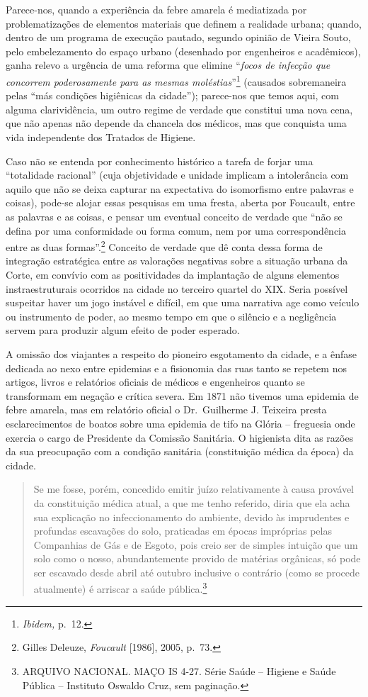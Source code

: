 Parece-nos, quando a experiência da febre amarela é mediatizada por
problematizações de elementos materiais que definem a realidade urbana;
quando, dentro de um programa de execução pautado, segundo opinião de
Vieira Souto, pelo embelezamento do espaço urbano (desenhado por
engenheiros e acadêmicos), ganha relevo a urgência de uma reforma que
elimine ``\emph{focos de infecção que concorrem poderosamente para as
mesmas moléstias}''\footnote{\emph{Ibidem,} p.~12.} (causados
sobremaneira pelas ``más condições higiênicas da cidade''); parece-nos
que temos aqui, com alguma clarividência, um outro regime de verdade que
constitui uma nova cena, que não apenas não depende da chancela dos
médicos, mas que conquista uma vida independente dos Tratados de
Higiene.

Caso não se entenda por conhecimento histórico a tarefa de forjar uma
``totalidade racional'' (cuja objetividade e unidade implicam a
intolerância com aquilo que não se deixa capturar na expectativa do
isomorfismo entre palavras e coisas), pode-se alojar essas pesquisas em
uma fresta, aberta por Foucault, entre as palavras e as coisas, e pensar
um eventual conceito de verdade que ``não se defina por uma conformidade
ou forma comum, nem por uma correspondência entre as duas
formas''.\footnote{Gilles Deleuze, \emph{Foucault} {[}1986{]}, 2005,
  p.~73.} Conceito de verdade que dê conta dessa forma de integração
estratégica entre as valorações negativas sobre a situação urbana da
Corte, em convívio com as positividades da implantação de alguns
elementos instraestruturais ocorridos na cidade no terceiro quartel do
XIX. Seria possível suspeitar haver um jogo instável e difícil, em que
uma narrativa age como veículo ou instrumento de poder, ao mesmo tempo
em que o silêncio e a negligência servem para produzir algum efeito de
poder esperado.

A omissão dos viajantes a respeito do pioneiro esgotamento da cidade, e
a ênfase dedicada ao nexo entre epidemias e a fisionomia das ruas tanto
se repetem nos artigos, livros e relatórios oficiais de médicos e
engenheiros quanto se transformam em negação e crítica severa. Em 1871
não tivemos uma epidemia de febre amarela, mas em relatório oficial o
Dr.~Guilherme J. Teixeira presta esclarecimentos de boatos sobre uma
epidemia de tifo na Glória -- freguesia onde exercia o cargo de
Presidente da Comissão Sanitária. O higienista dita as razões da sua
preocupação com a condição sanitária (constituição médica da época) da
cidade.

\begin{quote}
Se me fosse, porém, concedido emitir juízo relativamente à causa
provável da constituição médica atual, a que me tenho referido, diria
que ela acha sua explicação no infeccionamento do ambiente, devido às
imprudentes e profundas escavações do solo, praticadas em épocas
impróprias pelas Companhias de Gás e de Esgoto, pois creio ser de
simples intuição que um solo como o nosso, abundantemente provido de
matérias orgânicas, só pode ser escavado desde abril até outubro
inclusive o contrário (como se procede atualmente) é arriscar a saúde
pública.\footnote{ARQUIVO NACIONAL. MAÇO IS 4-27. Série Saúde -- Higiene
  e Saúde Pública -- Instituto Oswaldo Cruz, sem paginação.}
\end{quote}

